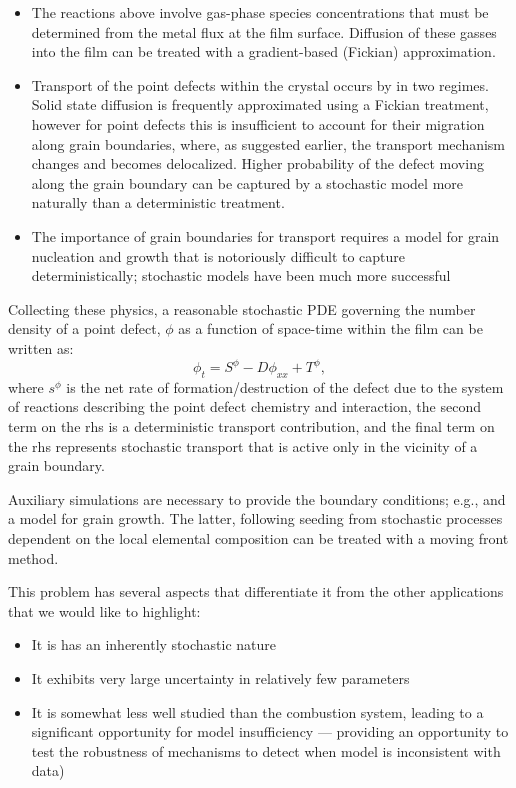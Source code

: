 \documentclass[11pt]{article}
\begin{document}
\begin{itemize}
\item The reactions above involve gas-phase species concentrations that must
be determined from the metal flux at the film surface. Diffusion of
these gasses into the film can be treated with a gradient-based
(Fickian) approximation. 

\item Transport of the point defects within the crystal occurs by in two
regimes. Solid state diffusion is frequently approximated using a
Fickian treatment, however for point defects this is insufficient to
account for their migration along grain boundaries, where, as
suggested earlier, the transport mechanism changes and becomes
delocalized. Higher probability of the defect moving along the grain
boundary can be captured by a stochastic model more naturally than a
deterministic treatment. 

\item The importance of grain boundaries for transport requires a model for
grain nucleation and growth that is notoriously difficult to capture
deterministically; stochastic models have been much more successful

\end{itemize}

Collecting these physics, a reasonable stochastic PDE governing the
number density of a point defect, $\phi$ as a function of space-time
within the film can be written as:
\begin{equation}
  \label{eq:3}
  \phi_t = S^\phi - D \phi_{xx}  + T^\phi,
\end{equation}
where $s^\phi$ is the net rate of formation/destruction of the defect
due to the system of reactions describing the point defect chemistry
and interaction, the second term on the rhs is a deterministic
transport contribution, and the final term on the rhs represents
stochastic transport that is active only in the vicinity of a grain
boundary. 

Auxiliary simulations are necessary to provide the boundary
conditions; e.g., \cite{cigs-parallel-simulation} and a model for
grain growth. The latter, following seeding from stochastic processes
dependent on the local elemental composition can be treated with a
moving front method. 

This problem has several aspects that differentiate it from the other
applications that we would like to highlight: 
\begin{itemize}
\item It is has an inherently stochastic nature
\item It exhibits very large uncertainty in relatively few parameters
\item It is somewhat less well studied than the combustion system,
  leading to a significant opportunity for model insufficiency ---
  providing an opportunity to test the robustness of mechanisms to
  detect when model is inconsistent with data)
\end{itemize}
\end{document}
